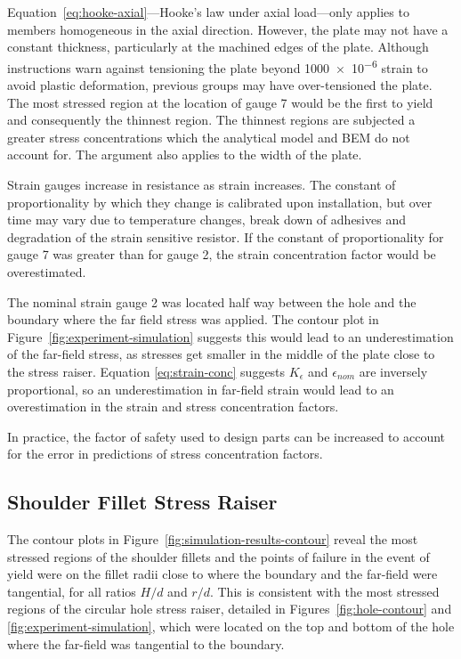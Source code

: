 \documentclass[a4paper,11pt,twocolumn]{article}
\newcommand{\BEM}{\textsc{BEM}\xspace}
\begin{document}
Equation~\eqref{eq:hooke-axial}---Hooke's law under axial load---only applies
to members homogeneous in the axial direction. However, the plate may not have a
constant thickness, particularly at the machined edges of the plate. Although 
instructions warn against tensioning the plate beyond \num{1000e-6} strain to
avoid plastic deformation, previous groups may have over-tensioned the plate.
The most stressed region at the location of gauge 7 would be the first to yield
and consequently the thinnest region. The thinnest regions are subjected a
greater stress concentrations which the analytical model and \BEM do not account
for. The argument also applies to the width of the plate.

Strain gauges increase in resistance as strain increases. The constant of
proportionality by which they change is calibrated upon installation, but over
time may vary due to temperature changes, break down of adhesives and
degradation of the strain sensitive resistor. If the constant of
proportionality for gauge 7 was greater than for gauge 2, the strain
concentration factor would be overestimated.

The nominal strain gauge 2 was located half way between the hole and the
boundary where the far field stress was applied. The contour plot in
Figure~\ref{fig:experiment-simulation} suggests this would lead to an
underestimation of the far-field stress, as stresses get smaller in the middle
of the plate close to the stress raiser. Equation \eqref{eq:strain-conc}
suggests $K_{\epsilon}$ and $\epsilon_{nom}$ are inversely proportional, so an
underestimation in far-field strain would lead to an overestimation in the
strain and stress concentration factors.

In practice, the factor of safety used to design parts can be increased to
account for the error in predictions of stress concentration factors.

\subsection{Shoulder Fillet Stress Raiser}

The contour plots in Figure~\vref{fig:simulation-results-contour} reveal the
most stressed regions of the shoulder fillets and the points of failure in
the event of yield were on the fillet radii close to where the boundary and the
far-field were tangential, for all ratios $H/d$ and $r/d$. This is consistent
with the most stressed regions of the circular hole stress raiser, detailed in 
Figures~\ref{fig:hole-contour} and \ref{fig:experiment-simulation}, which were
located on the top and bottom of the hole where the far-field was tangential to
the boundary.
\end{document}
